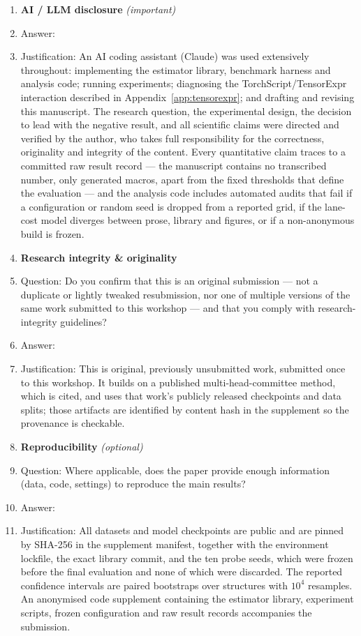 \begin{enumerate}
\item {\bf AI / LLM disclosure} \emph{(important)}
    \item[] Answer: \answerYes{}
    \item[] Justification: An AI coding assistant (Claude) was used extensively throughout: implementing the estimator library, benchmark harness and analysis code; running experiments; diagnosing the TorchScript/TensorExpr interaction described in Appendix~\ref{app:tensorexpr}; and drafting and revising this manuscript. The research question, the experimental design, the decision to lead with the negative result, and all scientific claims were directed and verified by the author, who takes full responsibility for the correctness, originality and integrity of the content. Every quantitative claim traces to a committed raw result record --- the manuscript contains no transcribed number, only generated macros, apart from the fixed thresholds that define the evaluation --- and the analysis code includes automated audits that fail if a configuration or random seed is dropped from a reported grid, if the lane-cost model diverges between prose, library and figures, or if a non-anonymous build is frozen.

\item {\bf Research integrity \& originality}
    \item[] Question: Do you confirm that this is an original submission --- not a duplicate or lightly tweaked resubmission, nor one of multiple versions of the same work submitted to this workshop --- and that you comply with research-integrity guidelines?
    \item[] Answer: \answerYes{}
    \item[] Justification: This is original, previously unsubmitted work, submitted once to this workshop. It builds on a published multi-head-committee method, which is cited, and uses that work's publicly released checkpoints and data splits; those artifacts are identified by content hash in the supplement so the provenance is checkable.

\item {\bf Reproducibility} \emph{(optional)}
    \item[] Question: Where applicable, does the paper provide enough information (data, code, settings) to reproduce the main results?
    \item[] Answer: \answerYes{}
    \item[] Justification: All datasets and model checkpoints are public and are pinned by SHA-256 in the supplement manifest, together with the environment lockfile, the exact library commit, and the ten probe seeds, which were frozen before the final evaluation and none of which were discarded. The reported confidence intervals are paired bootstraps over structures with $10^4$ resamples. An anonymised code supplement containing the estimator library, experiment scripts, frozen configuration and raw result records accompanies the submission.

\end{enumerate}
